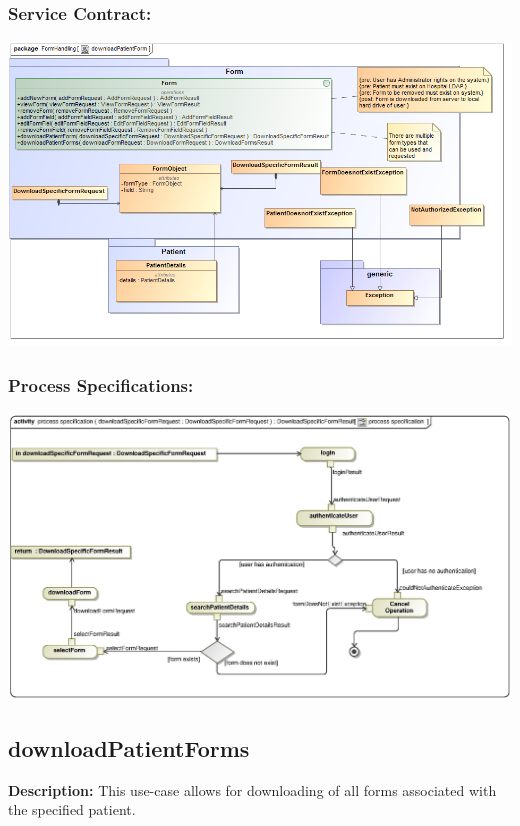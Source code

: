 \subsubsection{Service Contract:} 
\includegraphics[width=1\linewidth]{./Graphics/FormUseCaseDiagrams/downloadPatientForm}
\subsubsection{Process Specifications:}
\includegraphics[width=1\linewidth]{./Graphics/FormUseCaseDiagrams/processspecification_DownloadSpecificForm}





\subsection{downloadPatientForms} %
\textbf{Description:}
This use-case allows for downloading of all forms associated with the specified patient.
